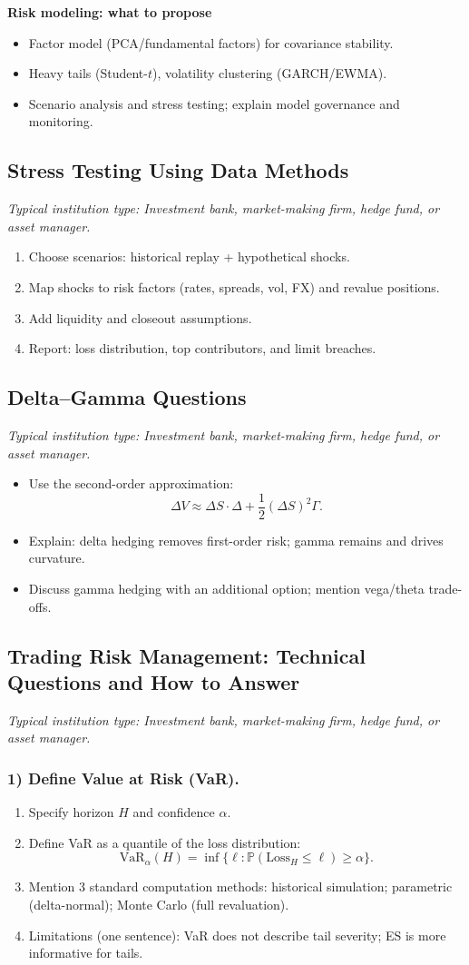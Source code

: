\documentclass[11pt,letterpaper,openany]{book}
\newcommand{\RoleProfile}[2]{%
  \subsection{#1}%
  \noindent\textit{Typical institution type: #2.}\par
}
\newcommand{\prompt}[1]{\subsubsection*{#1}}
\begin{document}
\textbf{Risk modeling: what to propose}
\begin{itemize}
  \item Factor model (PCA/fundamental factors) for covariance stability.
  \item Heavy tails (Student-$t$), volatility clustering (GARCH/EWMA).
  \item Scenario analysis and stress testing; explain model governance and monitoring.
\end{itemize}

\RoleProfile{Stress Testing Using Data Methods}{Investment bank, market-making firm, hedge fund, or asset manager}
\begin{enumerate}
  \item Choose scenarios: historical replay + hypothetical shocks.
  \item Map shocks to risk factors (rates, spreads, vol, FX) and revalue positions.
  \item Add liquidity and closeout assumptions.
  \item Report: loss distribution, top contributors, and limit breaches.
\end{enumerate}

\RoleProfile{Delta--Gamma Questions}{Investment bank, market-making firm, hedge fund, or asset manager}
\begin{itemize}
  \item Use the second-order approximation:
  \[
    \Delta V \approx \Delta S \cdot \Delta + \frac{1}{2}(\Delta S)^2\Gamma.
  \]
  \item Explain: delta hedging removes first-order risk; gamma remains and drives curvature.
  \item Discuss gamma hedging with an additional option; mention vega/theta trade-offs.
\end{itemize}

\RoleProfile{Trading Risk Management: Technical Questions and How to Answer}{Investment bank, market-making firm, hedge fund, or asset manager}

\prompt{1) Define Value at Risk (VaR).}
\begin{enumerate}
  \item Specify horizon $H$ and confidence $\alpha$.
  \item Define VaR as a quantile of the loss distribution:
  \[
    \mathrm{VaR}_{\alpha}(H) = \inf\{\ell : \mathbb{P}(\mathrm{Loss}_H \le \ell) \ge \alpha\}.
  \]
  \item Mention 3 standard computation methods: historical simulation; parametric (delta-normal); Monte Carlo (full revaluation).
  \item Limitations (one sentence): VaR does not describe tail severity; ES is more informative for tails.
\end{enumerate}
\end{document}
